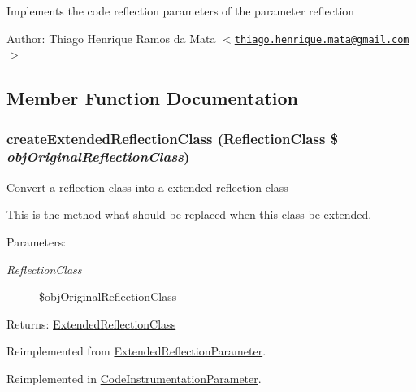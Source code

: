 Implements the code reflection parameters of the parameter reflection

\begin{Desc}
\item[Author:]Thiago Henrique Ramos da Mata $<$\href{mailto:thiago.henrique.mata@gmail.com}{\tt thiago.henrique.mata@gmail.com}$>$ \end{Desc}


\subsection{Member Function Documentation}
\hypertarget{class_code_reflection_parameter_6b56ec198bc6a5b5a72076e4e7c19e29}{
\subsubsection[{createExtendedReflectionClass}]{\setlength{\rightskip}{0pt plus 5cm}createExtendedReflectionClass (ReflectionClass \$ {\em objOriginalReflectionClass})}}
\label{class_code_reflection_parameter_6b56ec198bc6a5b5a72076e4e7c19e29}


Convert a reflection class into a extended reflection class

This is the method what should be replaced when this class be extended.

\begin{Desc}
\item[Parameters:]
\begin{description}
\item[{\em ReflectionClass}]\$objOriginalReflectionClass \end{description}
\end{Desc}
\begin{Desc}
\item[Returns:]\hyperlink{class_extended_reflection_class}{ExtendedReflectionClass} \end{Desc}


Reimplemented from \hyperlink{class_extended_reflection_parameter_6b56ec198bc6a5b5a72076e4e7c19e29}{ExtendedReflectionParameter}.

Reimplemented in \hyperlink{class_code_instrumentation_parameter_6b56ec198bc6a5b5a72076e4e7c19e29}{CodeInstrumentationParameter}.


